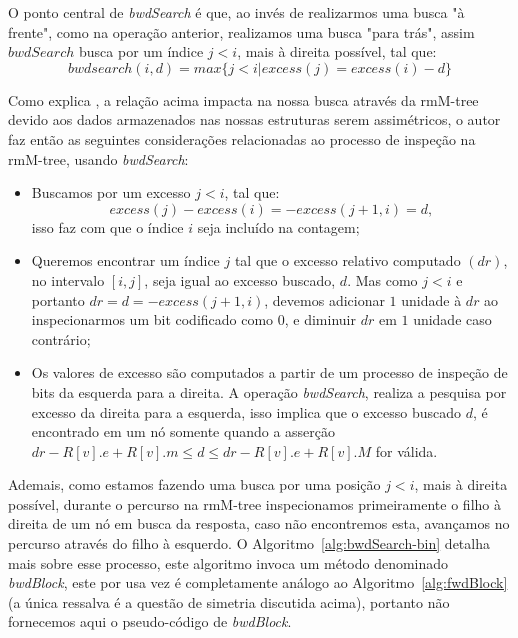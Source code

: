     O ponto central de \textit{bwdSearch} é que, ao invés de realizarmos uma busca "à frente", como na operação anterior, realizamos uma busca "para trás", assim $bwdSearch$ busca por um índice $j < i$, mais à direita possível, tal que:
    $$bwdsearch(i,d) = max\{j < i | excess(j) = excess(i) - d\}$$

    Como explica \citet{book-compact-data-structures}, a relação acima impacta na nossa busca através da rmM-tree devido aos dados armazenados nas nossas estruturas serem assimétricos, o autor faz então as seguintes considerações relacionadas ao processo de inspeção na rmM-tree,  usando \textit{bwdSearch}:
    \begin{itemize}
        \item Buscamos por um excesso $j<i$, tal que:
         $$excess(j) - excess(i) = - excess(j+1,i) = d,$$ 
         isso faz com que o índice $i$ seja incluído na contagem;
        \item Queremos encontrar um índice $j$ tal que o excesso relativo computado $(dr)$, no intervalo $[i,j]$, seja igual ao excesso buscado, $d$. Mas como $j < i $ e portanto $dr = d = -excess(j+1,i)$, devemos adicionar $1$ unidade à $dr$ ao inspecionarmos um bit codificado como $0$, e diminuir $dr$ em $1$ unidade caso contrário;
        \item  Os valores de excesso são computados a partir de um processo de inspeção de bits da esquerda para a direita. A operação \textit{bwdSearch}, realiza a pesquisa por excesso da direita para a esquerda, isso implica que o excesso buscado $d$, é encontrado em um nó somente quando a asserção $dr - R[v].e + R[v].m \leq d \leq dr - R[v].e + R[v].M$ for válida.
    \end{itemize}

    Ademais, como estamos fazendo uma busca por uma posição $j<i$, mais à direita possível, durante o percurso na rmM-tree inspecionamos primeiramente o filho à direita de um nó em busca da resposta, caso não encontremos esta, avançamos no percurso através do filho à esquerdo. O Algoritmo~\ref*{alg:bwdSearch-bin} detalha mais sobre esse processo, este algoritmo invoca um método denominado \textit{bwdBlock}, este por usa vez é completamente análogo  ao Algoritmo~\ref{alg:fwdBlock} (a única ressalva é a questão de simetria discutida acima), portanto não fornecemos aqui o pseudo-código de \textit{bwdBlock}.

